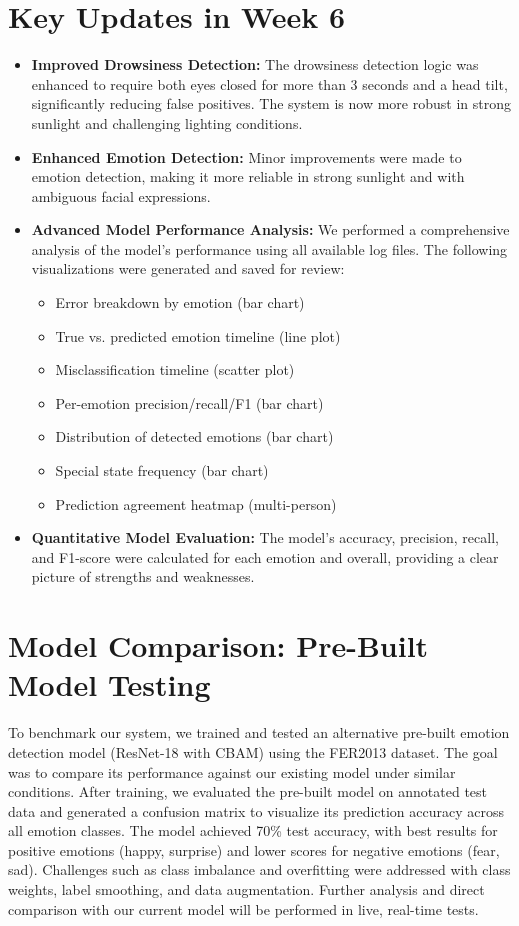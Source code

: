\documentclass[12pt]{article}
\begin{document}
\section{Key Updates in Week 6}
\begin{itemize}
    \item \textbf{Improved Drowsiness Detection:} The drowsiness detection logic was enhanced to require both eyes closed for more than 3 seconds and a head tilt, significantly reducing false positives. The system is now more robust in strong sunlight and challenging lighting conditions.
    \item \textbf{Enhanced Emotion Detection:} Minor improvements were made to emotion detection, making it more reliable in strong sunlight and with ambiguous facial expressions.
    \item \textbf{Advanced Model Performance Analysis:} We performed a comprehensive analysis of the model's performance using all available log files. The following visualizations were generated and saved for review:
    \begin{itemize}
        \item Error breakdown by emotion (bar chart)
        \item True vs. predicted emotion timeline (line plot)
        \item Misclassification timeline (scatter plot)
        \item Per-emotion precision/recall/F1 (bar chart)
        \item Distribution of detected emotions (bar chart)
        \item Special state frequency (bar chart)
        \item Prediction agreement heatmap (multi-person)
    \end{itemize}
    \item \textbf{Quantitative Model Evaluation:} The model's accuracy, precision, recall, and F1-score were calculated for each emotion and overall, providing a clear picture of strengths and weaknesses.
\end{itemize}

\section{Model Comparison: Pre-Built Model Testing}
To benchmark our system, we trained and tested an alternative pre-built emotion detection model (ResNet-18 with CBAM) using the FER2013 dataset. The goal was to compare its performance against our existing model under similar conditions. After training, we evaluated the pre-built model on annotated test data and generated a confusion matrix to visualize its prediction accuracy across all emotion classes. The model achieved 70\% test accuracy, with best results for positive emotions (happy, surprise) and lower scores for negative emotions (fear, sad). Challenges such as class imbalance and overfitting were addressed with class weights, label smoothing, and data augmentation. Further analysis and direct comparison with our current model will be performed in live, real-time tests.
\end{document}
